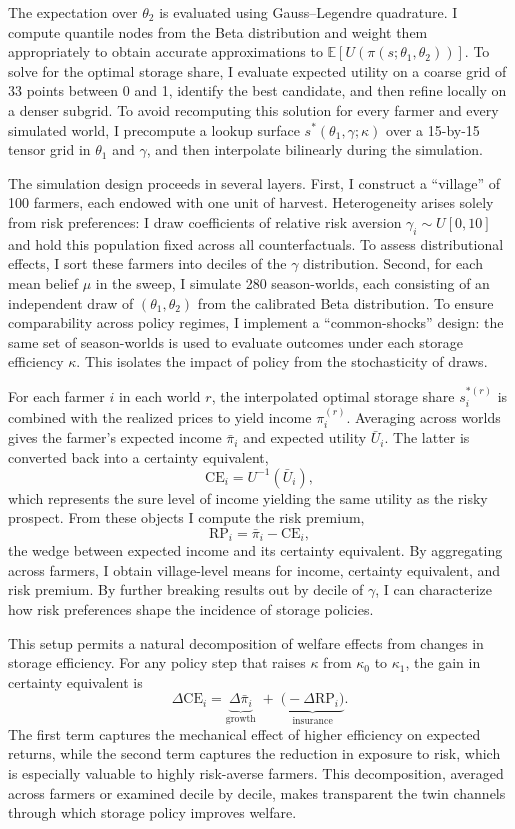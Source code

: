 The expectation over $\theta_2$ is evaluated using Gauss–Legendre quadrature. I compute quantile nodes from the Beta distribution and weight them appropriately to obtain accurate approximations to $\mathbb{E}[U(\pi(s;\theta_1,\theta_2))]$. To solve for the optimal storage share, I evaluate expected utility on a coarse grid of 33 points between 0 and 1, identify the best candidate, and then refine locally on a denser subgrid. To avoid recomputing this solution for every farmer and every simulated world, I precompute a lookup surface $s^{*}(\theta_1,\gamma;\kappa)$ over a 15-by-15 tensor grid in $\theta_1$ and $\gamma$, and then interpolate bilinearly during the simulation.

The simulation design proceeds in several layers. First, I construct a “village” of 100 farmers, each endowed with one unit of harvest. Heterogeneity arises solely from risk preferences: I draw coefficients of relative risk aversion $\gamma_i \sim U[0,10]$ and hold this population fixed across all counterfactuals. To assess distributional effects, I sort these farmers into deciles of the $\gamma$ distribution. Second, for each mean belief $\mu$ in the sweep, I simulate 280 season-worlds, each consisting of an independent draw of $(\theta_1,\theta_2)$ from the calibrated Beta distribution. To ensure comparability across policy regimes, I implement a “common-shocks” design: the same set of season-worlds is used to evaluate outcomes under each storage efficiency $\kappa$. This isolates the impact of policy from the stochasticity of draws.

For each farmer $i$ in each world $r$, the interpolated optimal storage share $s_i^{*(r)}$ is combined with the realized prices to yield income $\pi_i^{(r)}$. Averaging across worlds gives the farmer’s expected income $\bar{\pi}_i$ and expected utility $\bar U_i$. The latter is converted back into a certainty equivalent,
$$
\text{CE}_i = U^{-1}(\bar U_i),
$$
which represents the sure level of income yielding the same utility as the risky prospect. From these objects I compute the risk premium,
$$
\text{RP}_i = \bar \pi_i - \text{CE}_i,
$$
the wedge between expected income and its certainty equivalent. By aggregating across farmers, I obtain village-level means for income, certainty equivalent, and risk premium. By further breaking results out by decile of $\gamma$, I can characterize how risk preferences shape the incidence of storage policies.

This setup permits a natural decomposition of welfare effects from changes in storage efficiency. For any policy step that raises $\kappa$ from $\kappa_0$ to $\kappa_1$, the gain in certainty equivalent is
$$
\Delta \text{CE}_i = \underbrace{\Delta \bar \pi_i}_{\text{growth}} \;+\; \underbrace{\big(-\Delta \text{RP}_i\big)}_{\text{insurance}}.
$$
The first term captures the mechanical effect of higher efficiency on expected returns, while the second term captures the reduction in exposure to risk, which is especially valuable to highly risk-averse farmers. This decomposition, averaged across farmers or examined decile by decile, makes transparent the twin channels through which storage policy improves welfare.



